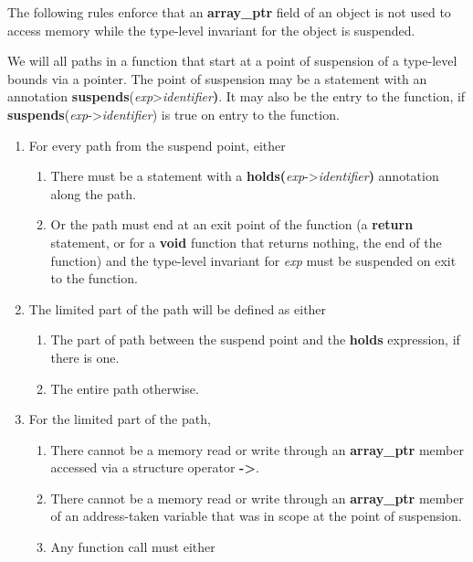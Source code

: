 \documentclass[]{article}
\begin{document}
The following rules enforce that an \textbf{array\_ptr} field of an
object is not used to access memory while the type-level invariant for
the object is suspended.

We will all paths in a function that start at a point of suspension of a
type-level bounds via a pointer. The point of suspension may be a
statement with an annotation
\textbf{suspends}(\emph{exp}\textgreater{}\emph{identifier}\textbf{)}.
It may also be the entry to the function, if
\textbf{suspends}(\emph{exp}-\textgreater{}\emph{identifier}) is true on
entry to the function.

\begin{enumerate}
\def\labelenumi{\arabic{enumi}.}
\item
  For every path from the suspend point, either

  \begin{enumerate}
  \def\labelenumii{\alph{enumii}.}
  \item
    There must be a statement with a
    \textbf{holds(}\emph{exp}-\textgreater{}\emph{identifier}\textbf{)}
    annotation along the path.
  \item
    Or the path must end at an exit point of the function (a
    \textbf{return} statement, or for a \textbf{void} function that
    returns nothing, the end of the function) and the type-level
    invariant for \emph{exp} must be suspended on exit to the function.
  \end{enumerate}
\item
  The limited part of the path will be defined as either

  \begin{enumerate}
  \def\labelenumii{\alph{enumii}.}
  \item
    The part of path between the suspend point and the \textbf{holds}
    expression, if there is one.
  \item
    The entire path otherwise.
  \end{enumerate}
\item
  For the limited part of the path,

  \begin{enumerate}
  \def\labelenumii{\alph{enumii}.}
  \item
    There cannot be a memory read or write through an
    \textbf{array\_ptr} member accessed via a structure operator
    \textbf{-\textgreater{}}.
  \item
    There cannot be a memory read or write through an
    \textbf{array\_ptr} member of an address-taken variable that was in
    scope at the point of suspension.
  \item
    Any function call must either


\end{enumerate}
\end{enumerate}
\end{document}

